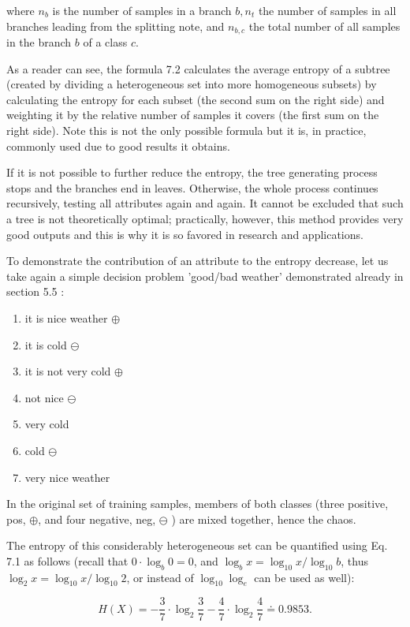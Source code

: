 where $n_{b}$ is the number of samples in a branch $b, n_{t}$ the number of samples in all branches leading from the splitting note, and $n_{b, c}$ the total number of all samples in the branch $b$ of a class $c$.

As a reader can see, the formula 7.2 calculates the average entropy of a subtree (created by dividing a heterogeneous set into more homogeneous subsets) by calculating the entropy for each subset (the second sum on the right side) and weighting it by the relative number of samples it covers (the first sum on the right side). Note this is not the only possible formula but it is, in practice, commonly used due to good results it obtains.

If it is not possible to further reduce the entropy, the tree generating process stops and the branches end in leaves. Otherwise, the whole process continues recursively, testing all attributes again and again. It cannot be excluded that such a tree is not theoretically optimal; practically, however, this method provides very good outputs and this is why it is so favored in research and applications.

To demonstrate the contribution of an attribute to the entropy decrease, let us take again a simple decision problem 'good/bad weather' demonstrated already in section 5.5 :

\begin{enumerate}
  \item it is nice weather $\oplus$
  \item it is cold $\ominus$
  \item it is not very cold $\oplus$
  \item not nice $\ominus$
  \item very cold
  \item cold $\ominus$
  \item very nice weather
\end{enumerate}

In the original set of training samples, members of both classes (three positive, pos, $\oplus$, and four negative, neg, $\ominus$ ) are mixed together, hence the chaos.

The entropy of this considerably heterogeneous set can be quantified using Eq. 7.1 as follows (recall that $0 \cdot \log _{b} 0=0$, and $\log _{b} x=\log _{10} x / \log _{10} b$, thus $\log _{2} x=\log _{10} x / \log _{10} 2$, or instead of $\log _{10} \log _{e}$ can be used as well):

$$
H(X)=-\frac{3}{7} \cdot \log _{2} \frac{3}{7}-\frac{4}{7} \cdot \log _{2} \frac{4}{7} \doteq 0.9853 .
$$

